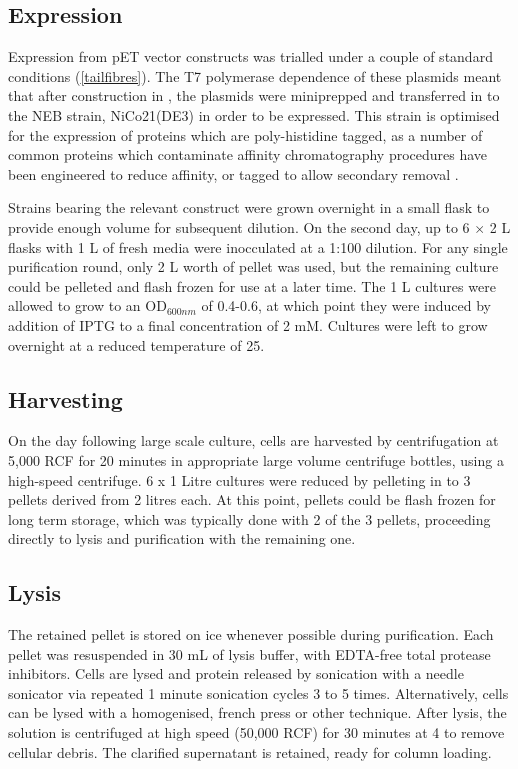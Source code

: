 \subsection{Expression}
	Expression from pET vector constructs was trialled under a couple of standard conditions (\vref{tailfibres}). The T7 polymerase dependence of these plasmids meant that after construction in \Ec, the plasmids were miniprepped and transferred in to the NEB strain, NiCo21(DE3) in order to be expressed. This strain is optimised for the expression of proteins which are poly-histidine tagged, as a number of common proteins which contaminate affinity chromatography procedures have been engineered to reduce affinity, or tagged to allow secondary removal \citep{Bolanos-Garcia2006, Robichon2011}.

Strains bearing the relevant construct were grown overnight in a small flask to provide enough volume for subsequent dilution. On the second day, up to 6 $\times$ 2 L flasks with 1 L of fresh media were inocculated at a 1:100 dilution. For any single purification round, only 2 L worth of pellet was used, but the remaining culture could be pelleted and flash frozen for use at a later time. The 1 L cultures were allowed to grow to an OD$_{600nm}$ of 0.4-0.6, at which point they were induced by addition of IPTG to a final concentration of 2 mM. Cultures were left to grow overnight at a reduced temperature of 25\degC.

\subsection{Harvesting}
On the day following large scale culture, cells are harvested by centrifugation at 5,000 RCF for 20 minutes in appropriate large volume centrifuge bottles, using a high-speed centrifuge. 6 x 1 Litre cultures were reduced by pelleting in to 3 pellets derived from 2 litres each. At this point, pellets could be flash frozen for long term storage, which was typically done with 2 of the 3 pellets, proceeding directly to lysis and purification with the remaining one.

\subsection{Lysis}
The retained pellet is stored on ice whenever possible during purification. Each pellet was resuspended in 30 mL of lysis buffer, with EDTA-free total protease inhibitors. Cells are lysed and protein released by sonication with a needle sonicator via repeated 1 minute sonication cycles 3 to 5 times. Alternatively, cells can be lysed with a homogenised, french press or other technique. After lysis, the solution is centrifuged at high speed (50,000 RCF) for 30 minutes at 4\degC{} to remove cellular debris. The clarified supernatant is retained, ready for column loading.


